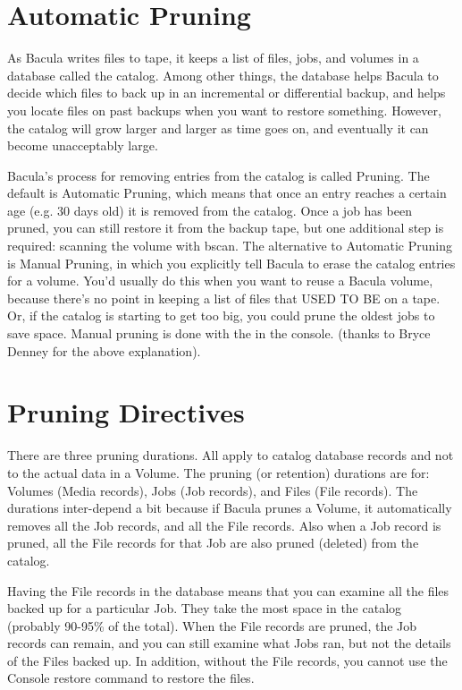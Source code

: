 \label{AutoPruning}
\section{Automatic Pruning}

As Bacula writes files to tape, it keeps a list of files, jobs, and volumes
in a database called the catalog.  Among other things, the database helps
Bacula to decide which files to back up in an incremental or differential
backup, and helps you locate files on past backups when you want to restore
something.  However, the catalog will grow larger and larger as time goes
on, and eventually it can become unacceptably large.

Bacula's process for removing entries from the catalog is called Pruning.
The default is Automatic Pruning, which means that once an entry reaches a
certain age (e.g.  30 days old) it is removed from the catalog.  Once a job
has been pruned, you can still restore it from the backup tape, but one
additional step is required: scanning the volume with bscan.  The
alternative to Automatic Pruning is Manual Pruning, in which you explicitly
tell Bacula to erase the catalog entries for a volume.  You'd usually do
this when you want to reuse a Bacula volume, because there's no point in
keeping a list of files that USED TO BE on a tape.  Or, if the catalog is
starting to get too big, you could prune the oldest jobs to save space.
Manual pruning is done with the  in
the console.  (thanks to Bryce Denney for the above explanation).

\section{Pruning Directives}

There are three pruning durations. All apply to catalog database records and
not to the actual data in a Volume. The pruning (or retention) durations are
for: Volumes (Media records), Jobs (Job records), and Files (File records).
The durations inter-depend a bit because if Bacula prunes a Volume, it
automatically removes all the Job records, and all the File records. Also when
a Job record is pruned, all the File records for that Job are also pruned
(deleted) from the catalog. 

Having the File records in the database means that you can examine all the
files backed up for a particular Job. They take the most space in the catalog
(probably 90-95\% of the total). When the File records are pruned, the Job
records can remain, and you can still examine what Jobs ran, but not the
details of the Files backed up. In addition, without the File records, you
cannot use the Console restore command to restore the files. 

